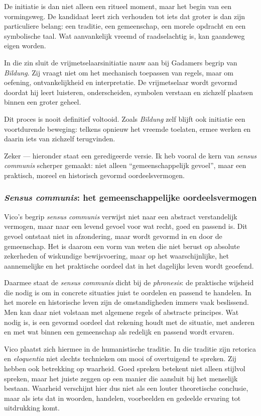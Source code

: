 \documentclass[11pt,twoside,openright]{memoir}
\begin{document}
De initiatie is dan niet alleen een ritueel moment, maar het begin van een vormingsweg. De kandidaat leert zich verhouden tot iets dat groter is dan zijn particuliere belang: een traditie, een gemeenschap, een morele opdracht en een symbolische taal. Wat aanvankelijk vreemd of raadselachtig is, kan gaandeweg eigen worden.

In die zin sluit de vrijmetselaarsinitiatie nauw aan bij Gadamers begrip van \textit{Bildung}. Zij vraagt niet om het mechanisch toepassen van regels, maar om oefening, ontvankelijkheid en interpretatie. De vrijmetselaar wordt gevormd doordat hij leert luisteren, onderscheiden, symbolen verstaan en zichzelf plaatsen binnen een groter geheel.

Dit proces is nooit definitief voltooid. Zoals \textit{Bildung} zelf blijft ook initiatie een voortdurende beweging: telkens opnieuw het vreemde toelaten, ermee werken en daarin iets van zichzelf terugvinden.

Zeker — hieronder staat een geredigeerde versie. Ik heb vooral de kern van \textit{sensus communis} scherper gemaakt: niet alleen “gemeenschappelijk gevoel”, maar een praktisch, moreel en historisch gevormd oordeelsvermogen.

\subsubsection{\textit{Sensus communis}: het gemeenschappelijke oordeelsvermogen}

Vico's begrip \textit{sensus communis} verwijst niet naar een abstract verstandelijk vermogen, maar naar een levend gevoel voor wat recht, goed en passend is. Dit gevoel ontstaat niet in afzondering, maar wordt gevormd in en door de gemeenschap. Het is daarom een vorm van weten die niet berust op absolute zekerheden of wiskundige bewijsvoering, maar op het waarschijnlijke, het aannemelijke en het praktische oordeel dat in het dagelijks leven wordt geoefend.

Daarmee staat de \textit{sensus communis} dicht bij de \textit{phronesis}: de praktische wijsheid die nodig is om in concrete situaties juist te oordelen en passend te handelen. In het morele en historische leven zijn de omstandigheden immers vaak beslissend. Men kan daar niet volstaan met algemene regels of abstracte principes. Wat nodig is, is een gevormd oordeel dat rekening houdt met de situatie, met anderen en met wat binnen een gemeenschap als redelijk en passend wordt ervaren.

Vico plaatst zich hiermee in de humanistische traditie. In die traditie zijn retorica en \textit{eloquentia} niet slechts technieken om mooi of overtuigend te spreken. Zij hebben ook betrekking op waarheid. Goed spreken betekent niet alleen stijlvol spreken, maar het juiste zeggen op een manier die aansluit bij het menselijk bestaan. Waarheid verschijnt hier dus niet als een louter theoretische conclusie, maar als iets dat in woorden, handelen, voorbeelden en gedeelde ervaring tot uitdrukking komt.
\end{document}
